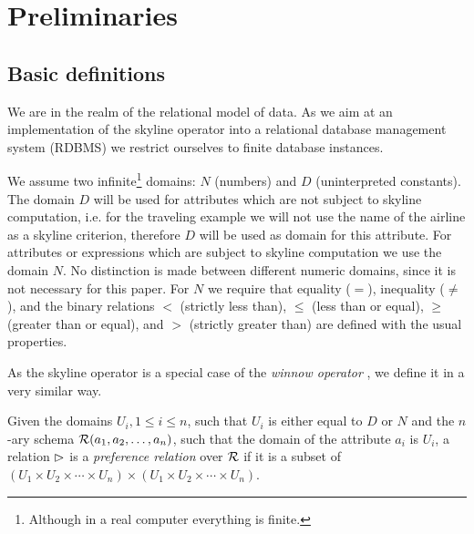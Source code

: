 \chapter{Preliminaries}
\label{chap:preliminaries}

\section{Basic definitions}


We are in the realm of the relational model of
data.  As we aim at an implementation of the skyline operator into a
relational database management system (RDBMS) we restrict ourselves
to finite database instances.

We assume two infinite\footnote{Although in a real computer 
everything is finite.} domains: $N$ (numbers) and $D$ (uninterpreted
constants). The domain $D$ will be used for attributes which are not
subject to skyline computation, i.e. for the traveling example we
will not use the name of the airline as a skyline criterion, therefore
$D$ will be used as domain for this attribute.  For attributes or
expressions which are subject to skyline computation we use the domain
$N$. No distinction is made between different numeric domains, since
it is not necessary for this paper. For $N$ we require that equality
($=$), inequality ($\not=$), and the binary relations $<$ (strictly
less than), $\le$ (less than or equal), $\ge$ (greater than or equal),
and $>$ (strictly greater than) are defined with the usual properties.

As the skyline operator is a special case of the \emph{winnow
operator} \citep{Chomicki2003a}, we define it in a very similar way.

\begin{definition}
Given the domains $U_i, 1 \le i \le n$, such that $U_i$ is either
equal to $D$ or $N$ and the $n$-ary schema $\mathcal{R}(a_1, a_2, \ldots,
a_n)$, such that the domain of the attribute $a_i$ is $U_i$, 
a relation $\vartriangleright$ is a \emph{preference relation} over
$\mathcal{R}$ if it is a subset of $(U_1 \times U_2 \times \cdots \times U_n) \times 
(U_1 \times U_2 \times \cdots \times U_n)$.
\end{definition}

